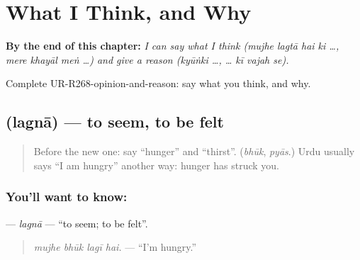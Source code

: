 
\chapter{What I Think, and Why}
\label{ch:ur-what-i-think-and-why}

\begin{chapteropening}
\textbf{By the end of this chapter:} \emph{I can say what I think (mujhe lagtā hai ki …, mere khayāl meṅ …) and give a reason (kyūṅki …, … kī vajah se).}

Complete UR-R268-opinion-and-reason: say what you think, and why.
\end{chapteropening}

\section[\texorpdfstring{\ur{لگنا} (lagnā)}{لگنا (lagnā)}]{ (lagnā) — to seem, to be felt}

\label{lesson:UR-C268-lagna}



\begin{quote}
Before the new one: say \textquotedblleft{}hunger\textquotedblright{} and \textquotedblleft{}thirst\textquotedblright{}. (\emph{bhūk}, \emph{pyās}.) Urdu usually says \textquotedblleft{}I am hungry\textquotedblright{} another way: hunger has struck you.
\end{quote}

\subsection*{You'll want to know: }
\textbf{} — \emph{lagnā} — \textquotedblleft{}to seem; to be felt\textquotedblright{}.

\begin{quote}
\textbf{   }
\end{quote}

\begin{quote}
\emph{mujhe bhūk lagī hai.} — \textquotedblleft{}I'm hungry.\textquotedblright{}
\end{quote}

